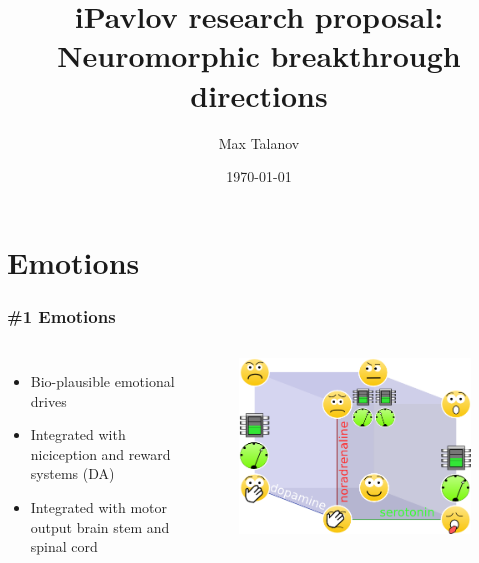 \documentclass[12pt, aspectratio=169]{beamer}
\title[HSE research proposal]{iPavlov research proposal: \\Neuromorphic breakthrough directions} %
\author[Max Talanov]{
  Max Talanov
}
\institute[for: iPavlov] %
{
for iPavlov \\ %
\medskip
\textit{max.talanov@gmail.com} %
}
\date{\today} %
\begin{document}
\begin{frame}
\titlepage %
\end{frame}



\section{Emotions}

\begin{frame}
\frametitle{\#1 Emotions}
\begin{columns}[c] %


\begin{itemize}
\item Bio-plausible emotional drives
\item Integrated with niciception and reward systems (DA)
\item Integrated with motor output brain stem and spinal cord
\end{itemize}

\begin{figure}
\includegraphics[width=0.8\linewidth]{cube_of_emotional_parameters_machine}
\end{figure}
\end{columns}
\end{frame}
\end{document}

